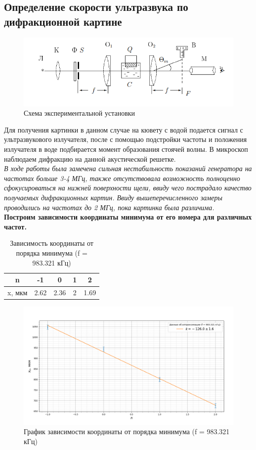 \documentclass[a4paper, 12pt]{article}%
\begin{document}
	\subsection{Определение скорости ультразвука по дифракционной картине}
	\begin{figure}[H]
		\centering
		\includegraphics[width=0.8\linewidth]{shema1}
		\caption{Схема экспериментальной установки}
		\label{fig:shema1}
	\end{figure}
	Для получения картинки в данном случае на кювету с водой подается сигнал с ультразвукового излучателя, после с помощью подстройки частоты и положения излучателя в воде подбирается момент образования стоячей волны. В микроскоп наблюдаем дифракцию на данной акустической решетке.\\
	\textit{В ходе работы была замечена сильная нестабильность показаний генератора на частотах больше 3-4 МГц, также отсутствовала возможность полноценно сфокусироваться на нижней поверхности щели, ввиду чего пострадало качество получаемых дифракционных картин. Ввиду вышеперечисленного замеры проводились на частотах до 2 МГц, пока картинка была различима.}\\
	\textbf{Построим зависимости координаты минимума от его номера для различных частот.}\\
	\begin{table}[H]
		\centering
		\begin{tabular}{|c|c|c|c|c|}
			\hline
			n      & -1   & 0    & 1 & 2    \\ \hline
			x, мкм & 2.62 & 2.36 & 2 & 1.69 \\ \hline
		\end{tabular}
		\caption{Зависимость координаты от порядка минимума (f = 983.321 кГц)}
	\end{table}
	\begin{figure}[H]
		\centering
		\includegraphics[width=0.8\linewidth]{graph_1}
		\caption{График зависимости координаты от порядка минимума (f = 983.321 кГц)}
		\label{fig:graph1}
	\end{figure}
\end{document}
